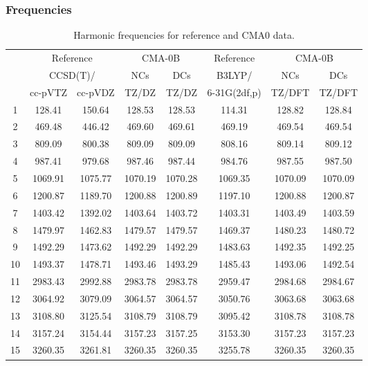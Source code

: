 \documentclass[10pt,oneside]{article}
\begin{document}
\clearpage

\subsubsection*{Frequencies}
\begin{table}[h!]
\centering
\caption{Harmonic frequencies for reference and CMA0 data.}
\begin{tabular}{cccccccc}
\toprule
{} & \multicolumn{2}{c}{Reference} & \multicolumn{2}{c}{CMA-0B} &    Reference & \multicolumn{2}{c}{CMA-0B} \\
{} & \multicolumn{2}{c}{CCSD(T)/} &     NCs &     DCs &       B3LYP/ &     NCs &     DCs \\
{} &   cc-pVTZ & cc-pVDZ &   TZ/DZ &   TZ/DZ & 6-31G(2df,p) &  TZ/DFT &  TZ/DFT \\
\midrule
1  &    128.41 &  150.64 &  128.53 &  128.53 &       114.31 &  128.82 &  128.84 \\
2  &    469.48 &  446.42 &  469.60 &  469.61 &       469.19 &  469.54 &  469.54 \\
3  &    809.09 &  800.38 &  809.09 &  809.09 &       808.16 &  809.14 &  809.12 \\
4  &    987.41 &  979.68 &  987.46 &  987.44 &       984.76 &  987.55 &  987.50 \\
5  &   1069.91 & 1075.77 & 1070.19 & 1070.28 &      1069.35 & 1070.09 & 1070.09 \\
6  &   1200.87 & 1189.70 & 1200.88 & 1200.89 &      1197.10 & 1200.88 & 1200.87 \\
7  &   1403.42 & 1392.02 & 1403.64 & 1403.72 &      1403.31 & 1403.49 & 1403.59 \\
8  &   1479.97 & 1462.83 & 1479.57 & 1479.57 &      1469.37 & 1480.23 & 1480.72 \\
9  &   1492.29 & 1473.62 & 1492.29 & 1492.29 &      1483.63 & 1492.35 & 1492.25 \\
10 &   1493.37 & 1478.71 & 1493.46 & 1493.29 &      1485.43 & 1493.06 & 1492.54 \\
11 &   2983.43 & 2992.88 & 2983.78 & 2983.78 &      2959.47 & 2984.68 & 2984.67 \\
12 &   3064.92 & 3079.09 & 3064.57 & 3064.57 &      3050.76 & 3063.68 & 3063.68 \\
13 &   3108.80 & 3125.54 & 3108.79 & 3108.79 &      3095.42 & 3108.78 & 3108.78 \\
14 &   3157.24 & 3154.44 & 3157.23 & 3157.25 &      3153.30 & 3157.23 & 3157.23 \\
15 &   3260.35 & 3261.81 & 3260.35 & 3260.35 &      3255.78 & 3260.35 & 3260.35 \\
\bottomrule
\end{tabular}
\end{table}
\end{document}
